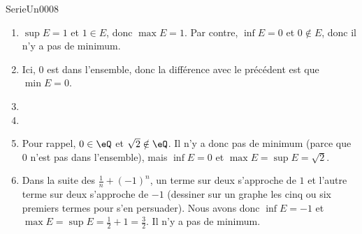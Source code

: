 

\begin{corrige}{SerieUn0008}

	\begin{enumerate}

		\item
			$\sup E=1$ et $1\in E$, donc $\max E=1$. Par contre, $\inf E=0$ et $0\notin E$, donc il n'y a pas de minimum.
		\item
			Ici, $0$ est dans l'ensemble, donc la différence avec le précédent est que $\min E=0$. 
		\item
		\item
		\item
			Pour rappel, $0\in\eQ$ et $\sqrt{2}\notin\eQ$. Il n'y a donc pas de minimum (parce que $0$ n'est pas dans l'ensemble), mais $\inf E=0$ et $\max E=\sup E=\sqrt{2}$.
		\item
			Dans la suite des $\frac{1}{ n }+(-1)^n$, un terme sur deux s'approche de $1$ et l'autre terme sur deux s'approche de $-1$ (dessiner sur un graphe les cinq ou six premiers termes pour s'en persuader). Nous avons donc $\inf E=-1$ et $\max E=\sup E=\frac{1}{ 2 }+1=\frac{ 3 }{ 2 }$. Il n'y a pas de minimum.

	\end{enumerate}

\end{corrige}
